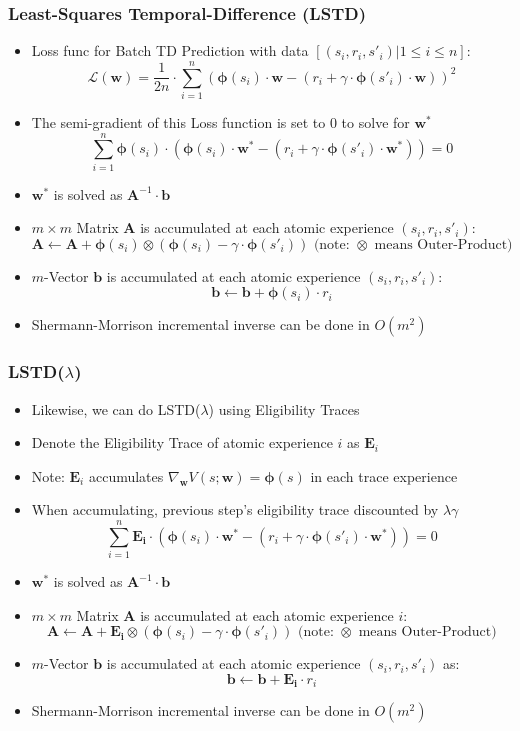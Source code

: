 \documentclass[handout]{beamer}
\begin{document}
\begin{frame}
\frametitle{Least-Squares Temporal-Difference (LSTD)}
\pause
\begin{itemize}[<+->]
\item Loss func for Batch TD Prediction with data $[(s_i, r_i, s'_i) | 1 \leq i \leq n]$:
$$\mathcal{L}(\bm{w}) = \frac 1 {2n} \cdot \sum_{i=1}^n (\bm{\phi}(s_i) \cdot \bm{w} - (r_i + \gamma \cdot \bm{\phi}(s'_i) \cdot \bm{w}))^2$$
\item The semi-gradient of this Loss function is set to 0 to solve for $\bm{w}^*$
$$\sum_{i=1}^n \bm{\phi}(s_i) \cdot (\bm{\phi}(s_i) \cdot \bm{w^*} - (r_i + \gamma \cdot \bm{\phi}(s'_i) \cdot \bm{w}^*)) = 0$$
\item $\bm{w}^*$ is solved as $\bm{A}^{-1} \cdot \bm{b}$
\item $m \times m$ Matrix $\bm{A}$ is accumulated at each atomic experience $(s_i, r_i, s'_i)$:
$$ \bm{A} \leftarrow \bm{A} + \bm{\phi}(s_i) \otimes (\bm{\phi}(s_i) - \gamma \cdot \bm{\phi}(s'_i)) \text{ (note: } \otimes \text{ means Outer-Product)}$$
\item $m$-Vector $\bm{b}$ is accumulated at each atomic experience $(s_i, r_i, s'_i)$:
$$\bm{b} \leftarrow \bm{b} + \bm{\phi}(s_i) \cdot r_i$$
\item Shermann-Morrison incremental inverse can be done in $O(m^2)$
\end{itemize}
\end{frame}

\begin{frame}
\frametitle{LSTD($\lambda$)}
\pause
\begin{itemize}[<+->]
\item Likewise, we can do LSTD($\lambda$) using Eligibility Traces
\item Denote the Eligibility Trace of atomic experience $i$ as $\bm{E}_i$
\item Note: $\bm{E}_i$ accumulates $\nabla_{\bm{w}} V(s;\bm{w}) = \bm{\phi}(s)$ in each trace experience
\item When accumulating, previous step's eligibility trace discounted by $\lambda \gamma$
$$\sum_{i=1}^n \bm{E_i} \cdot (\bm{\phi}(s_i) \cdot \bm{w^*} - (r_i + \gamma \cdot \bm{\phi}(s'_i) \cdot \bm{w}^*)) = 0$$
\item $\bm{w}^*$ is solved as $\bm{A}^{-1} \cdot \bm{b}$
\item $m \times m$ Matrix $\bm{A}$ is accumulated at each atomic experience $i$:
$$ \bm{A} \leftarrow \bm{A} + \bm{E_i} \otimes (\bm{\phi}(s_i) - \gamma \cdot \bm{\phi}(s'_i)) \text{ (note: } \otimes \text{ means Outer-Product)}$$
\item $m$-Vector $\bm{b}$ is accumulated at each atomic experience $(s_i, r_i, s'_i)$ as:
$$\bm{b} \leftarrow \bm{b} + \bm{E_i} \cdot r_i$$
\item Shermann-Morrison incremental inverse can be done in $O(m^2)$
\end{itemize}
\end{frame}
\end{document}
